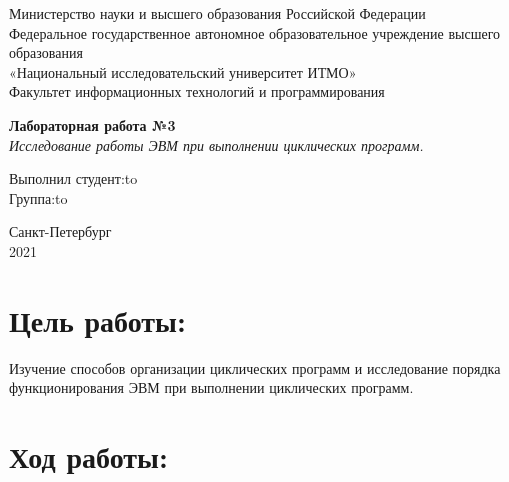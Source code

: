 \documentclass[a4paper,14pt]{article}
\begin{document}
\begin{titlepage}
\newpage

\begin{center}
Министерство науки и высшего образования Российской Федерации\\
Федеральное государственное автономное образовательное учреждение высшего образования\\
«Национальный исследовательский университет ИТМО»\\
Факультет информационных технологий и программирования\\
\end{center}

\vspace{\fill}

\begin{center}
\textbf{Лабораторная работа №3}\\
\textit{Исследование работы ЭВМ при выполнении циклических программ.}
\end{center}

\vspace{\fill}

\newbox{\lbox}
\newlength{\maxl}
\setlength{\maxl}{\wd\lbox}
\hfill\parbox{14cm}{
\hspace*{5cm}Выполнил студент:\hfill\hbox to\\
\hspace*{5cm}Группа:\hfill\hbox to\\
}


\vspace{8em}

\begin{center}
Санкт-Петербург \\2021
\end{center}

\end{titlepage}


\section*{Цель работы:}
Изучение способов организации циклических программ и
исследование порядка функционирования ЭВМ при выполнении циклических программ.
\section*{Ход работы:}
\end{document}
